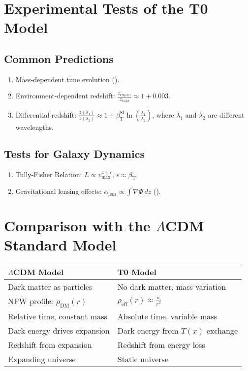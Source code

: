\documentclass[a4paper,12pt]{article}
\theoremstyle{definition}
\theoremstyle{remark}
\newcommand{\Tfield}{T(x)}
\newcommand{\betaT}{\beta_{\text{T}}}
\begin{document}
	\section{Experimental Tests of the T0 Model}
	
	\subsection{Common Predictions}
	
	\begin{enumerate}
		\item Mass-dependent time evolution (\cite{pascher_photons_2025}).
		\item Environment-dependent redshift: \(\frac{z_{\text{Cluster}}}{z_{\text{Void}}} \approx 1 + 0.003\).
		\item Differential redshift: \(\frac{z(\lambda_1)}{z(\lambda_2)} \approx 1 + \betaT^{\text{SI}} \ln\left(\frac{\lambda_1}{\lambda_2}\right)\), where \(\lambda_1\) and \(\lambda_2\) are different wavelengths.

	\end{enumerate}
	
	\subsection{Tests for Galaxy Dynamics}
	
	\begin{enumerate}
		\item Tully-Fisher Relation: \(L \propto v_{\text{max}}^{4 + \epsilon}\), \(\epsilon \approx \betaT\).
		\item Gravitational lensing effects: \(\alpha_{\text{lens}} \propto \int \nabla \Phi \, dz\) (\cite{pascher_galaxies_2025}).
	\end{enumerate}
	
	\section{Comparison with the \(\Lambda\)CDM Standard Model}
	
	\begin{tcolorbox}[colback=yellow!5!white,colframe=yellow!75!black,title=Model Comparison]
		\begin{tabular}{p{}|p{}}
			\toprule
			\textbf{\(\Lambda\)CDM Model} & \textbf{T0 Model} \\
			\midrule
			Dark matter as particles & No dark matter, mass variation \\
			NFW profile: \(\rho_{\text{DM}}(r)\) & \(\rho_{\text{eff}}(r) \approx \frac{\kappa}{r^2}\) \\
			Relative time, constant mass & Absolute time, variable mass \\
			Dark energy drives expansion & Dark energy from \(\Tfield\) exchange \\
			Redshift from expansion & Redshift from energy loss \\
			Expanding universe & Static universe \\
			\bottomrule
		\end{tabular}
	\end{tcolorbox}
	
\end{document}
